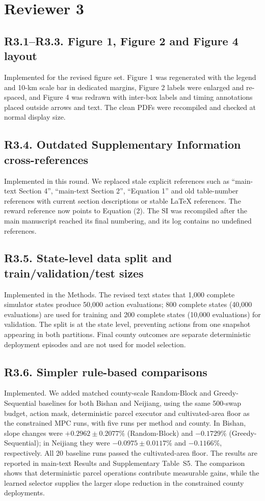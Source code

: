 ﻿\documentclass[11pt]{article}
\begin{document}
\section*{Reviewer 3}
\subsection*{R3.1--R3.3. Figure 1, Figure 2 and Figure 4 layout}
Implemented for the revised figure set. Figure 1 was regenerated with the legend and 10-km scale bar in dedicated margins, Figure 2 labels were enlarged and re-spaced, and Figure 4 was redrawn with inter-box labels and timing annotations placed outside arrows and text. The clean PDFs were recompiled and checked at normal display size.

\subsection*{R3.4. Outdated Supplementary Information cross-references}
Implemented in this round. We replaced stale explicit references such as ``main-text Section 4'', ``main-text Section 2'', ``Equation 1'' and old table-number references with current section descriptions or stable LaTeX references. The reward reference now points to Equation (2). The SI was recompiled after the main manuscript reached its final numbering, and its log contains no undefined references.

\subsection*{R3.5. State-level data split and train/validation/test sizes}
Implemented in the Methods. The revised text states that 1,000 complete simulator states produce 50,000 action evaluations; 800 complete states (40,000 evaluations) are used for training and 200 complete states (10,000 evaluations) for validation. The split is at the state level, preventing actions from one snapshot appearing in both partitions. Final county outcomes are separate deterministic deployment episodes and are not used for model selection.

\subsection*{R3.6. Simpler rule-based comparisons}
Implemented. We added matched county-scale Random-Block and Greedy-Sequential baselines for both Bishan and Neijiang, using the same 500-swap budget, action mask, deterministic parcel executor and cultivated-area floor as the constrained MPC runs, with five runs per method and county. In Bishan, slope changes were $+0.2962\pm0.2077\%$ (Random-Block) and $-0.1729\%$ (Greedy-Sequential); in Neijiang they were $-0.0975\pm0.0117\%$ and $-0.1166\%$, respectively. All 20 baseline runs passed the cultivated-area floor. The results are reported in main-text Results and Supplementary Table~S5. The comparison shows that deterministic parcel operations contribute measurable gains, while the learned selector supplies the larger slope reduction in the constrained county deployments.
\end{document}
